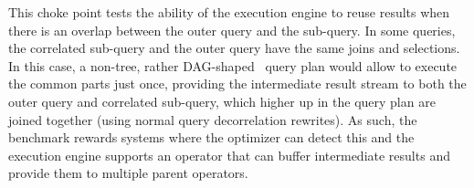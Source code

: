 
This choke point tests the ability of the execution engine to reuse results when
there is an overlap between the outer query and the sub-query. In some queries,
the correlated sub-query and the outer query have the same joins and selections.
In this case, a non-tree, rather DAG-shaped~\cite{DBLP:conf/btw/NeumannM09}
query plan would allow to execute the common parts just once, providing the
intermediate result stream to both the outer query and correlated sub-query,
which higher up in the query plan are joined together (using normal query
decorrelation rewrites). As such, the benchmark rewards systems where the
optimizer can detect this and the execution engine supports an operator that can
buffer intermediate results and provide them to multiple parent operators.


